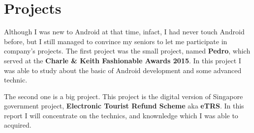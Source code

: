\section{Projects}

Although I was new to Android at that time, infact, I had never touch Android before, but I still managed to convince my seniors to let me participate in company's projects. The first project was the small project, named \textbf{Pedro}, which served at the \textbf{Charle \& Keith Fashionable Awards 2015}. In this project I was able to study about the basic of Android development and some advanced technic.

The second one is a big project. This project is the digital version of Singapore government project, \textbf{Electronic Tourist Refund Scheme} aka \textbf{eTRS}. In this report I will concentrate on the technics, and knownledge which I was able to acquired. 
